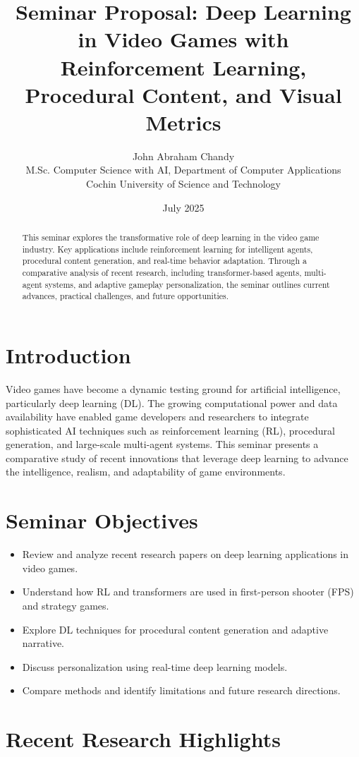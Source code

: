\documentclass[12pt]{article}
\title{\textbf{Seminar Proposal: Deep Learning in Video Games with\\Reinforcement Learning, Procedural Content, and Visual Metrics}}
\author{John Abraham Chandy \\ M.Sc. Computer Science with AI, Department of Computer Applications \\ Cochin University of Science and Technology}
\date{July 2025}
\begin{document}
\maketitle

\begin{abstract}
This seminar explores the transformative role of deep learning in the video game industry. Key applications include reinforcement learning for intelligent agents, procedural content generation, and real-time behavior adaptation. Through a comparative analysis of recent research, including transformer-based agents, multi-agent systems, and adaptive gameplay personalization, the seminar outlines current advances, practical challenges, and future opportunities.
\end{abstract}

\section{Introduction}
Video games have become a dynamic testing ground for artificial intelligence, particularly deep learning (DL). The growing computational power and data availability have enabled game developers and researchers to integrate sophisticated AI techniques such as reinforcement learning (RL), procedural generation, and large-scale multi-agent systems. This seminar presents a comparative study of recent innovations that leverage deep learning to advance the intelligence, realism, and adaptability of game environments.

\section{Seminar Objectives}
\begin{itemize}[noitemsep]
    \item Review and analyze recent research papers on deep learning applications in video games.
    \item Understand how RL and transformers are used in first-person shooter (FPS) and strategy games.
    \item Explore DL techniques for procedural content generation and adaptive narrative.
    \item Discuss personalization using real-time deep learning models.
    \item Compare methods and identify limitations and future research directions.
\end{itemize}

\section{Recent Research Highlights}
\end{document}

